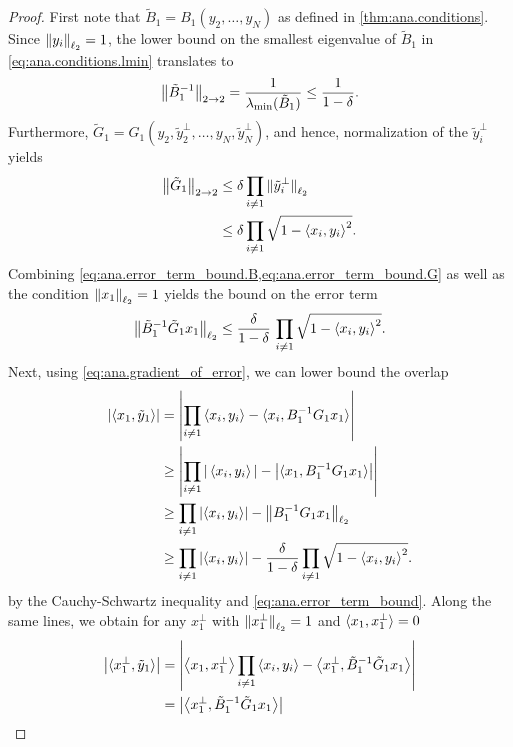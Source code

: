 \begin{proof}
  First note that $\tilde B_1 = B_1(y_2, \ldots, y_N)$ as defined in \cref{thm:ana.conditions}.
  Since ${\Vert y_i\Vert}_{\ell_2} = 1$, the lower bound on the smallest eigenvalue of $\tilde B_1$ in \cref{eq:ana.conditions.lmin} translates to
  \[
    \label{eq:ana.error_term_bound.B}
    {\left\Vert\tilde B_1^{-1}\right\Vert}_{2 \to 2} = \frac{1}{\lambda_\mathrm{min}(\tilde B_1)} \le \frac{1}{1 - \delta}.
  \]
  Furthermore, $\tilde G_1 = G_1(y_2, \tilde y_2^\perp, \ldots, y_N, \tilde y_N^\perp)$, and hence, normalization of the $\tilde y_i^\perp$ yields
  \[
    \label{eq:ana.error_term_bound.G}
    \begin{split}
      {\left\Vert\tilde G_1\right\Vert}_{2 \to 2}
      &\le \delta \prod_{i \neq 1} {\Vert\tilde y_i^\perp\Vert}_{\ell_2} \\
      &\le \delta \prod_{i \neq 1} \sqrt{1 - {\braket{x_i, y_i}}^2}.
    \end{split}
  \]
  Combining \cref{eq:ana.error_term_bound.B,eq:ana.error_term_bound.G} as well as the condition ${\Vert x_1\Vert}_{\ell_2} = 1$ yields the bound on the error term
  \[
    \label{eq:ana.error_term_bound}
    {\left\Vert\tilde B_1^{-1} \tilde G_1 x_1\right\Vert}_{\ell_2} \leq \frac{\delta}{1 - \delta} \, \prod_{i \neq 1} \sqrt{1 - {\braket{x_i, y_i}}^2}.
  \]
  Next, using \cref{eq:ana.gradient_of_error}, we can lower bound the overlap
  \begin{align}
    {\left\vert\braket{x_1, \tilde y_1}\right\vert}
    &= {\left\vert\prod_{i \neq 1} \braket{x_i, y_i} - \braket{x_i, B_1^{-1} G_1 x_1}\right\vert} \\
    &\ge {\left\vert\prod_{i \neq 1} {\vert\braket{x_i, y_i}\vert} - {\left\vert\braket{x_1, B_1^{-1} G_1 x_1}\right\vert}\right\vert} \\
    &\ge {\prod_{i \neq 1} {\left\vert\braket{x_i, y_i}\right\vert} - {\left\Vert B_1^{-1} G_1 x_1\right\Vert}_{\ell_2}} \\
    &\ge {\prod_{i \neq 1} {\left\vert\braket{x_i, y_i}\right\vert} - \frac{\delta}{1 - \delta} \prod_{i \neq 1} \sqrt{1 - {\braket{x_i, y_i}}^2}}.
    \label{eq:ana.local_error_bound_step.overlap_x}
  \end{align}
  by the Cauchy-Schwartz inequality and \cref{eq:ana.error_term_bound}.
  Along the same lines, we obtain for any $x_1^\perp$ with ${\Vert x_1^\perp\Vert}_{\ell_2} = 1$ and $\braket{x_1, x_1^\perp} = 0$
  \begin{align}
    \Abs{\braket{x_1^\perp, \tilde y_1}}
    &= \Abs{\Braket{x_1, x_1^\perp} \prod_{i \neq 1} \Braket{x_i, y_i} - \Braket{x_1^\perp, \tilde B_1^{-1} \tilde G_1 x_1}} \\
    &= \Abs{\Braket{x_1^\perp, \tilde B_1^{-1} \tilde G_1 x_1}} \\

\end{align}
\end{proof}
